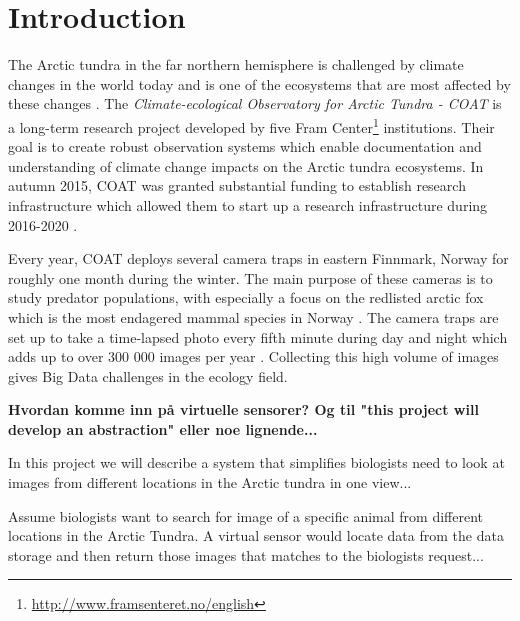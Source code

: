 \documentclass[USenglish]{uit-thesis}
\begin{document}
\tableofcontents

\listoffigures

\mainmatter

\chapter{Introduction}
The Arctic tundra in the far northern hemisphere is challenged by climate changes in the world today and is one of the ecosystems that are most affected by these changes \cite{coat2016}. The \textit{Climate-ecological Observatory for Arctic Tundra - COAT} is a long-term research project developed by five Fram Center\footnote{\url{http://www.framsenteret.no/english}} institutions. Their goal is to create robust observation systems which enable documentation and understanding of climate change impacts on the Arctic tundra ecosystems. In autumn 2015, COAT was granted substantial funding to establish research infrastructure which allowed them to start up a research infrastructure during 2016-2020 \cite{coat2016}. 

Every year, COAT deploys several camera traps in eastern Finnmark, Norway for roughly one month during the winter. The main purpose of these cameras is to study predator populations, with especially a focus on the redlisted arctic fox which is the most endagered mammal species in Norway  \cite{coatplan2016}. 
The camera traps are set up to take a time-lapsed photo every fifth minute during day and night which adds up to over 300 000 images per year \cite{methodseco}. Collecting this high volume of images gives Big Data challenges in the ecology field. 

\textbf{Hvordan komme inn på virtuelle sensorer? Og til "this project will develop an abstraction" eller noe lignende...}

In this project we will describe a system that simplifies biologists need  to look at images from different locations in the Arctic tundra in one view...

Assume biologists want to search for image of a specific animal from different locations in the Arctic Tundra. A virtual sensor would locate data from the data storage and then return those images that matches to the biologists request...
\end{document}
